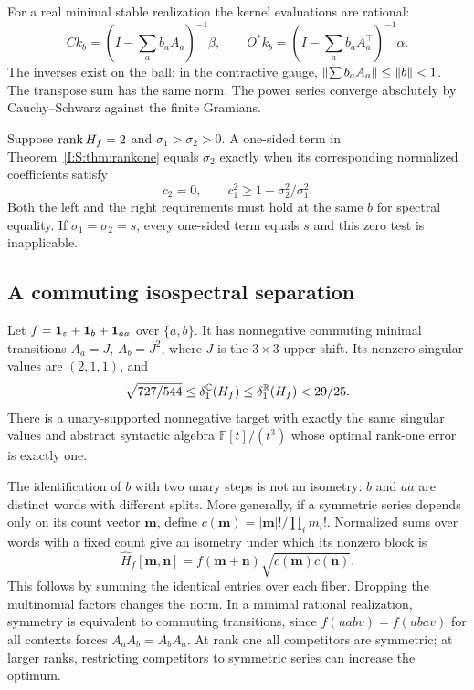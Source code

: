 For a real minimal stable realization the kernel evaluations are rational:
\[
 Ck_b=(I-\sum_a b_aA_a)^{-1}\beta,\qquad
 O^*k_b=(I-\sum_a b_aA_a^\top)^{-1}\alpha.
\]
The inverses exist on the ball: in the contractive gauge,
$\left\lVert\sum b_aA_a\right\rVert\le\left\lVert b\right\rVert<1$. The transpose sum has the same norm. The power series converge absolutely by Cauchy--Schwarz against the finite Gramians.

\begin{corollary}\label{I:S:cor:secular}
Suppose $\operatorname{rank} H_f=2$ and $\sigma_1>\sigma_2>0$. A one-sided term in Theorem~\ref{I:S:thm:rankone} equals $\sigma_2$ exactly when its corresponding normalized coefficients satisfy
\[
 c_2=0,\qquad c_1^2\ge1-\sigma_2^2/\sigma_1^2.
\]
Both the left and the right requirements must hold at the same $b$ for spectral equality. If $\sigma_1=\sigma_2=s$, every one-sided term equals $s$ and this zero test is inapplicable.
\end{corollary}


\subsection{A commuting isospectral separation}
\begin{theorem}\label{I:S:thm:commutative}
Let $f=\mathbf1_{\varepsilon}+\mathbf1_b+\mathbf1_{aa}$ over $\{a,b\}$. It has nonnegative commuting minimal transitions $A_a=J$, $A_b=J^2$, where $J$ is the $3\times3$ upper shift. Its nonzero singular values are $(2,1,1)$, and
\[
 \sqrt{727/544}\le\delta_1^\mathbb C(H_f)\le\delta_1^\mathbb R(H_f)<29/25.
\]
There is a unary-supported nonnegative target with exactly the same singular values and abstract syntactic algebra $\mathbb F[t]/(t^3)$ whose optimal rank-one error is exactly one.
\end{theorem}


The identification of $b$ with two unary steps is not an isometry: $b$ and $aa$ are distinct words with different splits. More generally, if a symmetric series depends only on its count vector $\mathbf m$, define $c(\mathbf m)=|\mathbf m|!/\prod_i m_i!$. Normalized sums over words with a fixed count give an isometry under which its nonzero block is
\[
 \widehat H_f[\mathbf m,\mathbf n]
 =f(\mathbf m+\mathbf n)\sqrt{c(\mathbf m)c(\mathbf n)}.
\]
This follows by summing the identical entries over each fiber. Dropping the multinomial factors changes the norm. In a minimal rational realization, symmetry is equivalent to commuting transitions, since $f(uabv)=f(ubav)$ for all contexts forces $A_aA_b=A_bA_a$. At rank one all competitors are symmetric; at larger ranks, restricting competitors to symmetric series can increase the optimum.

